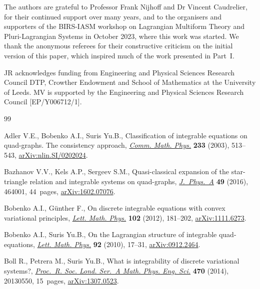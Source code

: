 \documentclass[10pt,a4paper]{amsart}
\numberwithin{equation}{section}
\begin{document}
The authors are grateful to Professor Frank Nijhoff and Dr Vincent Caudrelier, for their continued support over many years, and to the organisers and supporters of the BIRS-IASM workshop on Lagrangian Multiform Theory and Pluri-Lagrangian Systems in October 2023, where this work was started. We thank the anonymous referees for their constructive criticism on the initial version of this paper, which inspired much of the work presented in Part~I.

JR acknowledges funding from Engineering and Physical Sciences Research Council DTP, Crowther Endowment and School of Mathematics at the University of Leeds. MV is supported by the Engineering and Physical Sciences Research Council [EP/Y006712/1].


\begin{thebibliography}{99}
\footnotesize\itemsep=0pt

Adler V.E., Bobenko A.I., Suris Yu.B., Classification of integrable equations on
 quad-graphs. {T}he consistency approach,
 \href{https://doi.org/10.1007/s00220-002-0762-8}{\textit{Comm. Math. Phys.}}
 \textbf{233} (2003), 513--543,
 \href{http://arxiv.org/abs/nlin.SI/0202024}{arXiv:nlin.SI/0202024}.

Bazhanov V.V., Kels A.P., Sergeev S.M., Quasi-classical expansion of the
 star-triangle relation and integrable systems on quad-graphs,
 \href{https://doi.org/10.1088/1751-8113/49/46/464001}{\textit{J.~Phys.~A}}
 \textbf{49} (2016), 464001, 44~pages,
 \href{http://arxiv.org/abs/1602.07076}{arXiv:1602.07076}.

Bobenko A.I., G\"unther F., On discrete integrable equations with convex
 variational principles,
 \href{https://doi.org/10.1007/s11005-012-0583-4}{\textit{Lett. Math. Phys.}}
 \textbf{102} (2012), 181--202,
 \href{http://arxiv.org/abs/1111.6273}{arXiv:1111.6273}.

Bobenko A.I., Suris Yu.B., On the {L}agrangian structure of integrable
 quad-equations,
 \href{https://doi.org/10.1007/s11005-010-0381-9}{\textit{Lett. Math. Phys.}}
 \textbf{92} (2010), 17--31,
 \href{http://arxiv.org/abs/0912.2464}{arXiv:0912.2464}.

Boll R., Petrera M., Suris Yu.B., What is integrability of discrete variational
 systems?, \href{https://doi.org/10.1098/rspa.2013.0550}{\textit{Proc.~R. Soc.
 Lond. Ser.~A Math. Phys. Eng. Sci.}} \textbf{470} (2014), 20130550, 15~pages,
 \href{http://arxiv.org/abs/1307.0523}{arXiv:1307.0523}.


\end{thebibliography}
\end{document}
